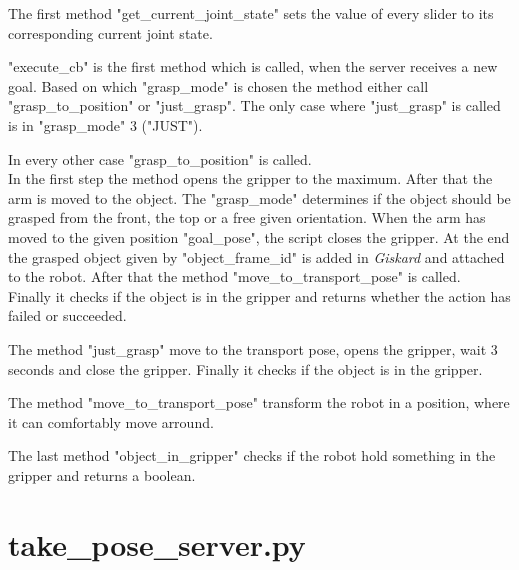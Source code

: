 \documentclass[main.tex]{subfiles}
\begin{document}
			 \vspace{0,75 cm}
			 The first method "get\_current\_joint\_state"  sets the value of every slider to its corresponding current joint state.
			 
			 \vspace{0,25 cm}
			 "execute\_cb" is the first method which is called, when the server receives a new goal. Based on which "grasp\_mode" is chosen the method either call "grasp\_to\_position" or "just\_grasp". The only case where "just\_grasp" is called is in "grasp\_mode" 3 ("JUST").
			 
			 \vspace{0,25 cm}
			 In every other case "grasp\_to\_position" is called.\\
			In the first step the method opens the gripper to the maximum. After that the arm is moved to the object. The "grasp\_mode" determines if the object should be grasped from the front, the top or a free given orientation. When the arm has moved to the given position "goal\_pose", the script closes the gripper. At the end the grasped object given by "object\_frame\_id" is added in \textit{Giskard} and attached to the robot. After that the method "move\_to\_transport\_pose" is called.\\
			Finally it checks if the object is in the gripper and returns whether the action has failed or succeeded.
			
			\vspace{0,25 cm}
			The method "just\_grasp" move to the transport pose, opens the gripper, wait 3 seconds and close the gripper. Finally it checks if the object is in the gripper.
			
			\vspace{0,25 cm}
			The method "move\_to\_transport\_pose" transform the robot in a position, where it can comfortably move arround.
			
			\vspace{0,25 cm}
			The last method "object\_in\_gripper" checks if the robot hold something in the gripper and returns a boolean.\\
			
			\section{take\_pose\_server.py} 
			
\end{document}

